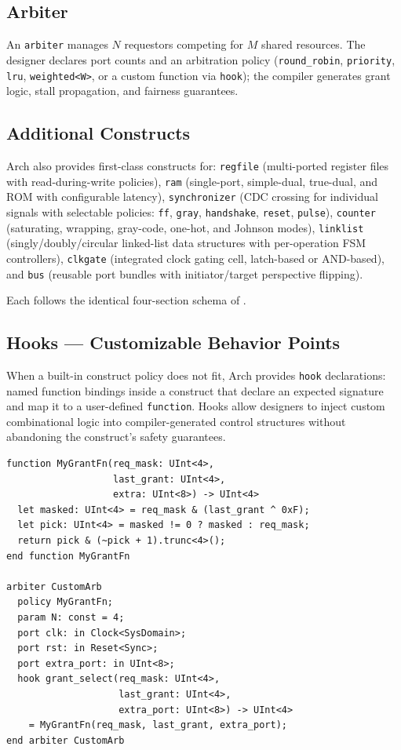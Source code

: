 \documentclass[11pt,twocolumn]{article}
\begin{document}
\subsection{Arbiter}

An \texttt{arbiter} manages $N$ requestors competing for $M$ shared resources. The designer declares port counts and an arbitration policy (\texttt{round\_robin}, \texttt{priority}, \texttt{lru}, \texttt{weighted<W>}, or a custom function via \texttt{hook}); the compiler generates grant logic, stall propagation, and fairness guarantees.

\subsection{Additional Constructs}

Arch also provides first-class constructs for:
\texttt{regfile} (multi-ported register files with read-during-write policies),
\texttt{ram} (single-port, simple-dual, true-dual, and ROM with configurable latency),
\texttt{synchronizer} (CDC crossing for individual signals with selectable policies: \texttt{ff}, \texttt{gray}, \texttt{handshake}, \texttt{reset}, \texttt{pulse}),
\texttt{counter} (saturating, wrapping, gray-code, one-hot, and Johnson modes),
\texttt{linklist} (singly/doubly/circular linked-list data structures with per-operation FSM controllers),
\texttt{clkgate} (integrated clock gating cell, latch-based or AND-based), and
\texttt{bus} (reusable port bundles with initiator/target perspective flipping).

Each follows the identical four-section schema of .

\subsection{Hooks --- Customizable Behavior Points}\label{sec:hooks}

When a built-in construct policy does not fit, Arch provides \texttt{hook} declarations: named function bindings inside a construct that declare an expected signature and map it to a user-defined \texttt{function}. Hooks allow designers to inject custom combinational logic into compiler-generated control structures without abandoning the construct's safety guarantees.

\begin{lstlisting}[language=Arch,caption={Custom arbiter policy via hook},label={lst:hook}]
function MyGrantFn(req_mask: UInt<4>,
                   last_grant: UInt<4>,
                   extra: UInt<8>) -> UInt<4>
  let masked: UInt<4> = req_mask & (last_grant ^ 0xF);
  let pick: UInt<4> = masked != 0 ? masked : req_mask;
  return pick & (~pick + 1).trunc<4>();
end function MyGrantFn

arbiter CustomArb
  policy MyGrantFn;
  param N: const = 4;
  port clk: in Clock<SysDomain>;
  port rst: in Reset<Sync>;
  port extra_port: in UInt<8>;
  hook grant_select(req_mask: UInt<4>,
                    last_grant: UInt<4>,
                    extra_port: UInt<8>) -> UInt<4>
    = MyGrantFn(req_mask, last_grant, extra_port);
end arbiter CustomArb
\end{lstlisting}
\end{document}
